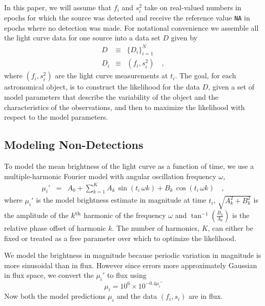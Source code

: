 \documentclass[12pt,preprint]{aastex}
\newcommand{\fobs}{f_i}
\newcommand{\sobs}{s^2_i}
\begin{document}
In this paper, we will assume that $\fobs$ and $\sobs$ take on real-valued numbers in epochs for which the source was detected and receive the reference value {\tt NA} in epochs where no detection was made. For notational convenience we assemble all the light curve data for one source into a data set $D$ given by
\begin{eqnarray}\displaystyle
D &\equiv& \{D_i\}_{i=1}^N
\\
D_i &\equiv& (\fobs, \sobs)
\quad ,
\end{eqnarray}
where $(\fobs, \sobs)$ are the light curve measurements  at $t_i$.  The goal, for each astronomical object, is to construct the likelihood for the data $D$, given a set of model parameters that describe the variability of the object and the characteristics of the observations, and then to maximize the likelihood with respect to the model parameters.%

\subsection{Modeling Non-Detections}
To model the mean brightness of the light curve as a function of time, we use a multiple-harmonic Fourier model with angular oscillation frequency $\omega$,
\begin{eqnarray}\displaystyle
\mu_i' &=& A_0 + \sum_{k=1}^K A_k\, \sin (t_i \, \omega  k) + B_k\, \cos (t_i \, \omega  k)
\quad ,\label{eq:fourier}
\end{eqnarray}
where $\mu_i'$ is the model brightness estimate in magnitude at time $t_i$, $\sqrt{A_k^2 + B_k^2}$ is the amplitude of the $k^{\rm th}$ harmonic of the frequency $\omega$ and $\tan^{-1}(\frac{B_k}{A_k})$ is the relative phase offset of harmonic $k$.  The number of harmonics, $K$, can either be fixed or treated as a free parameter over which to optimize the likelihood.

We model the brightness in magnitude because periodic variation in magnitude is more sinusoidal than in flux. However since errors more approximately Gaussian in flux space, we convert the $\mu_i'$ to flux  using
\begin{equation*}
\mu_i = 10^6 \times 10^{-0.4 \mu_i'}
\end{equation*}
Now both the model predictions $\mu_i$ and the data $(f_i,s_i)$ are in flux.
\end{document}

